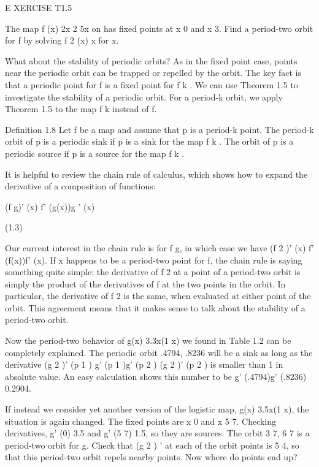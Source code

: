 \documentclass[12pt]{article}
\begin{document}
 

E XERCISE T1.5

The map f (x)  2x 2  5x on has fixed points at x  0 and x  3. Find a period-two orbit for f by solving f 2 
(x)  x for x.

What about the stability of periodic orbits? As in the fixed point case, points near the periodic orbit can 
be trapped or repelled by the orbit. The key fact is that a periodic point for f is a fixed point for f k . 
We can use Theorem 1.5 to investigate the stability of a periodic orbit. For a period-k orbit, we apply 
Theorem 1.5 to the map f k instead of f.


Definition 1.8 Let f be a map and assume that p is a period-k point. The period-k orbit of p is a periodic 
sink if p is a sink for the map f k . The orbit of p is a periodic source if p is a source for the map f k 
.

It is helpful to review the chain rule of calculus, which shows how to expand the derivative of a 
composition of functions:

(f   g)' (x)  f' (g(x))g ' (x)

(1.3)

Our current interest in the chain rule is for f  g, in which case we have (f 2 )' (x)  f' (f(x))f' (x). If 
x happens to be a period-two point for f, the chain rule is saying something quite simple: the derivative 
of f 2 at a point of a period-two orbit is simply the product of the derivatives of f at the two points in 
the orbit. In particular, the derivative of f 2 is the same, when evaluated at either point of the orbit. 
This agreement means that it makes sense to talk about the stability of a period-two orbit.

Now the period-two behavior of g(x)  3.3x(1  x) we found in Table 1.2 can be completely explained. The 
periodic orbit .4794, .8236  will be a sink as long as the derivative (g 2 )' (p 1 )  g' (p 1 )g' (p 2 )  
(g 2 )' (p 2 ) is smaller than 1 in absolute value. An easy calculation shows this number to be g' 
(.4794)g' (.8236)  0.2904.

If instead we consider yet another version of the logistic map, g(x)  3.5x(1  x), the situation is again 
changed. The fixed points are x  0 and x  5  7. Checking derivatives, g' (0)  3.5 and g' (5  7)  1.5, so 
they are sources. The orbit 3  7, 6  7  is a period-two orbit for g. Check that (g 2 ) ' at each of the 
orbit points is 5  4, so that this period-two orbit repels nearby points. Now where do points end up?
\end{document}
